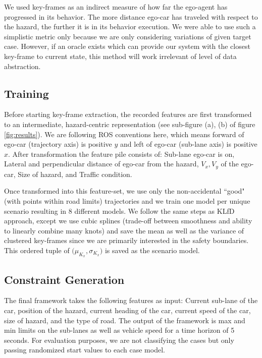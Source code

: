 \documentclass{article}
\begin{document}
We used key-frames as an indirect measure of how far the ego-agent has progressed
in its behavior. The more distance ego-car has traveled with respect to the hazard,
the further it is in its behavior execution. We were able to use such a simplistic
metric only because we are only considering variations of given target case. However,
if an oracle exists which can provide our system with the closest key-frame to current 
state, this method will work irrelevant of level of data abstraction.

\subsection{Training}
\label{sec:key-frames}

Before starting key-frame extraction, the recorded features 
are first transformed to an intermediate, hazard-centric representation
(see sub-figure (a), (b) of figure \ref{fig:results}). We are following ROS conventions here, which means 
forward of ego-car (trajectory axis) is positive $y$ and left of ego-car 
(sub-lane axis) is positive $x$. After transformation the feature pile consists of:  
 Sub-lane ego-car is on, Lateral and perpendicular distance of ego-car from the hazard, 
 $V_{x}, V_{y}$ of the ego-car, Size of hazard, and Traffic condition.

Once transformed into this feature-set, we use only the non-accidental 
``good" (with points within road limits) trajectories and we train one model per unique scenario resulting in 
8 different models.
We follow the same steps as KLfD approach, except we use cubic splines (trade-off
between smoothness and ability to linearly combine many knots) and save 
the mean as well as the variance of clustered key-frames since we are 
primarily interested in the safety boundaries. This ordered tuple of 
$\big(\mu_{K_{x}}, \sigma_{K_{x}}\big)$ is saved as the scenario model.

\subsection{Constraint Generation}

The final framework takes the following features as input: Current sub-lane of the car,
position of the hazard, current heading of the car, current speed of the car, size of 
hazard, and the type of road.
The output of the framework is max and min limits on the sub-lanes as well as 
vehicle speed for a time horizon of 5 seconds. For evaluation purposes, we are not
classifying the cases but only passing randomized start values to each case model.
\end{document}
